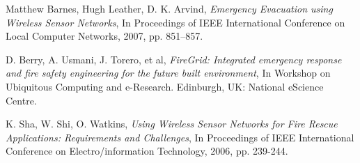 \documentclass{../local}
\begin{document}
\begin{thebibliography}{9}

 Matthew Barnes, Hugh Leather, D. K. Arvind, \emph{Emergency Evacuation using Wireless Sensor Networks}, In Proceedings of IEEE International Conference on Local Computer Networks, 2007, pp. 851–857.

D. Berry, A. Usmani, J. Torero, et al, \emph{FireGrid: Integrated
emergency response and fire safety engineering for the future built environment}, In Workshop on
Ubiquitous Computing and e-Research. Edinburgh, UK: National eScience Centre.

 K. Sha, W. Shi, O. Watkins, \emph{Using Wireless Sensor Networks for Fire Rescue Applications: Requirements and Challenges}, In Proceedings of IEEE International Conference on Electro/information Technology, 2006, pp. 239-244.


\end{thebibliography}
\end{document}

